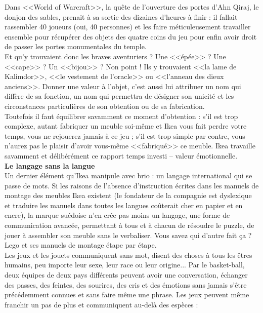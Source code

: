 \documentclass[11pt,twoside,a4paper]{article}
\begin{document}
Dans <<World of Warcraft>>, la qu{\^e}te de l'ouverture des portes d'Ahn Qiraj, le donjon des sables, prenait {\`a} sa sortie des dizaines d'heures {\`a} finir : il fallait rassembler 40 joueurs (oui, 40 personnes) et les faire m{\'e}ticuleusement travailler ensemble pour r{\'e}cup{\'e}rer des objets des quatre coins du jeu pour enfin avoir droit de passer les portes monumentales du temple.~\\

Et qu'y trouvaient donc les braves aventuriers ? Une <<{\'e}p{\'e}e>> ? Une <<cape>> ? Un <<bijou>> ? Non point ! Ils y trouvaient <<la lame de Kalimdor>>, <<le vestement de l'oracle>> ou <<l'anneau des dieux anciens>>. Donner une valeur {\`a} l'objet, c'est aussi lui attribuer un nom qui diff{\`e}re de sa fonction, un nom qui permettra de d{\'e}signer son unicit{\'e} et les circonstances particuli{\`e}res de son obtention ou de sa fabrication.~\\


Toutefois il faut {\'e}quilibrer savamment ce moment d'obtention : s'il est trop complexe, autant fabriquer un meuble soi-m{\^e}me et Ikea vous fait perdre votre temps, vous ne rejouerez jamais {\`a} ce jeu ; s'il est trop simple par contre, vous n'aurez pas le plaisir d'avoir vous-m{\^e}me <<fabriqu{\'e}>> ce meuble. Ikea travaille savamment et d{\'e}lib{\'e}r{\'e}ment ce rapport temps investi -- valeur {\'e}motionnelle.~\\

\textbf{\large Le langage sans la langue}~\\

Un dernier {\'e}l{\'e}ment qu'Ikea manipule avec brio : un langage international qui se passe de mots. Si les raisons de l'absence d'instruction {\'e}crites dans les manuels de montage des meubles Ikea existent (le fondateur de la compagnie est dyslexique et traduire les manuels dans toutes les langues co{\^u}terait cher en papier et en encre), la marque su{\'e}doise n'en cr{\'e}e pas moins un langage, une forme de communication avanc{\'e}e, permettant {\`a} tous et {\`a} chacun de r{\'e}soudre le puzzle, de jouer {\`a} assembler son meuble sans le verbaliser. Vous savez qui d'autre fait \c{c}a ? Lego et ses manuels de montage {\'e}tape par {\'e}tape.~\\

Les jeux et les jouets communiquent sans mot, disent des choses {\`a} tous les {\^e}tres humains, peu importe leur sexe, leur race ou leur origine... Par le basket-ball, deux {\'e}quipes de deux pays diff{\'e}rents peuvent avoir une conversation, {\'e}changer des passes, des feintes, des sourires, des cris et des {\'e}motions sans jamais s'{\^e}tre pr{\'e}c{\'e}demment connues et sans faire m{\^e}me une phrase. Les jeux peuvent m{\^e}me franchir un pas de plus et communiquent au-del{\`a} des esp{\`e}ces :~\\
\end{document}
